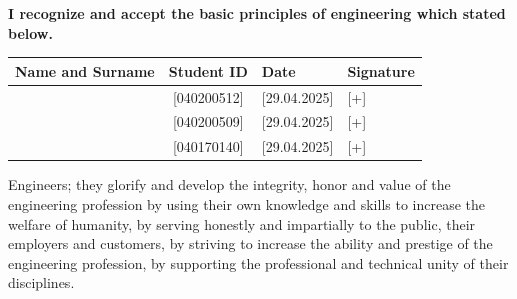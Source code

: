 \label{EthicalRulesComplianceStatement} %
\thesisspacing %

\textbf{I recognize and accept the basic principles of engineering which stated below.}\\
%
%
\renewcommand{\arraystretch}{2} %
\begin{table}[h]
    \centering
    \begin{tabular}{|l|c|m{3cm}|m{4cm}|} %
        \hline
        \textbf{Name and Surname} & \textbf{Student ID} & \textbf{Date} &\textbf{Signature} \\
        \hline
        [Kürşat Döşkaya] & [040200512] & [29.04.2025] & [+]  \\
        \hline
        [Kenan Selçuk] & [040200509] & [29.04.2025] & [+] \\
        \hline
        [Burak Uğur] & [040170140] & [29.04.2025] & [+] \\
        \hline
    \end{tabular}
\end{table}
%
%
%
\medskip

Engineers; they glorify and develop the integrity, honor and value of the engineering profession by using their own knowledge and skills to increase the welfare of humanity, by serving honestly and impartially to the public, their employers and customers, by striving to increase the ability and prestige of the engineering profession, by supporting the professional and technical unity of their disciplines.

